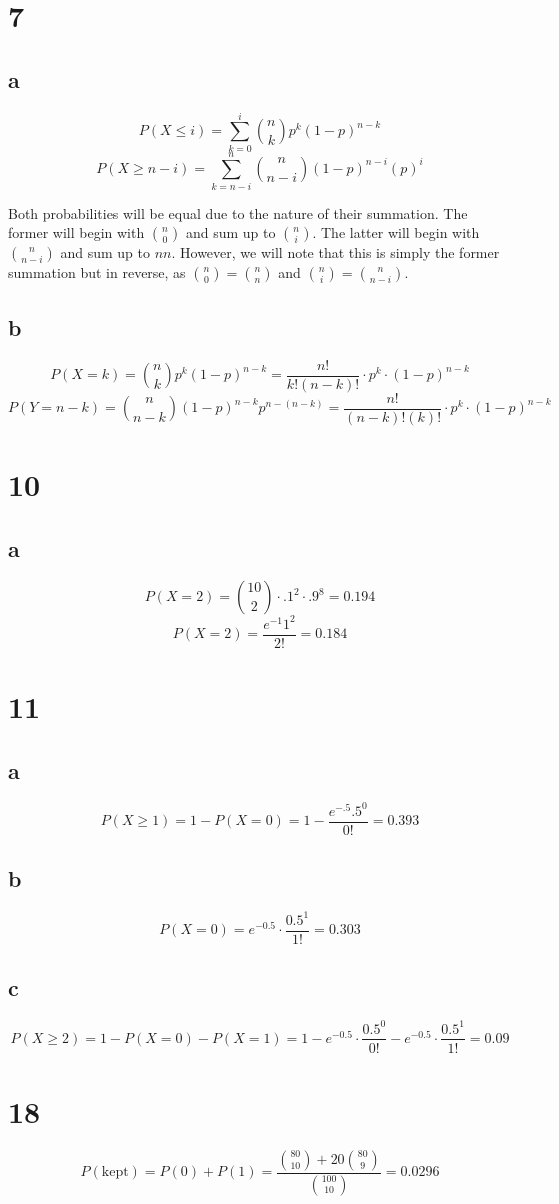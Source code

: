 \documentclass[12pt]{article}
\begin{document}
  \section*{7}
  \subsection*{a}
  $$ P(X \leq i) = \sum_{k=0}^{i} \binom{n}{k} p^k(1-p)^{n-k} $$
  $$ P(X \geq n-i) = \sum_{k = n-i}^{n} \binom{n}{n-i} (1-p)^{n-i}(p)^{i} $$

  Both probabilities will be equal due to the nature of their summation. The former will begin with $\binom{n}{0}$ and sum up to $\binom{n}{i}$. The latter will begin with $\binom{n}{n-i}$ and sum up to ${n}{n}$. However, we will note that this is simply the former summation but in reverse, as $\binom{n}{0} = \binom{n}{n}$ and $\binom{n}{i} = \binom{n}{n-i}$. 

  \subsection*{b}
  $$ P(X = k) = \binom{n}{k}p^k(1-p)^{n-k} = \frac{n!}{k!(n-k)!} \cdot p^k \cdot (1-p)^{n-k} $$
  $$ P(Y = n-k) = \binom{n}{n-k}(1-p)^{n-k}p^{n-(n-k)} = \frac{n!}{(n-k)!(k)!} \cdot p^k \cdot (1-p)^{n-k} $$

  \section{10}
  \subsection*{a}
  $$P(X = 2) = \binom{10}{2} \cdot .1^2 \cdot .9^8 = 0.194$$
  $$P(X = 2) = \frac{e^{-1}1^2}{2!} = 0.184$$

  \section*{11}
  \subsection*{a}
  $$P(X \geq 1) = 1 - P(X = 0) = 1 - \frac{e^{-.5}.5^0}{0!} = 0.393$$
  \subsection*{b}
  $$P(X = 0) = e^{-0.5} \cdot \frac{0.5^1}{1!} = 0.303$$
  \subsection*{c}
  $$P(X \geq 2) = 1 - P(X = 0) - P(X = 1) = 1 - e^{-0.5} \cdot \frac{0.5^0}{0!} - e^{-0.5} \cdot \frac{0.5^1}{1!} = 0.09$$

  \section*{18}

  $$P(\text{kept}) = P(0) + P(1) = \frac{\binom{80}{10} + 20\binom{80}{9}}{\binom{100}{10}} = 0.0296$$
\end{document}
